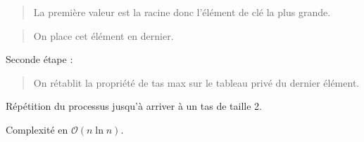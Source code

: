 \begin{quote}
La première valeur est la racine donc l'élément de clé la plus grande.
\end{quote}

\begin{quote}
\vspace{-2mm}

On place cet élément en dernier.
\end{quote}

Seconde étape : \vspace{-2mm}

\begin{quote}
On rétablit la propriété de tas max sur le tableau privé du dernier
élément.
\end{quote}

Répétition du processus jusqu'à arriver à un tas de taille 2.

Complexité en \(\mathcal{O}(n \ln n)\).
